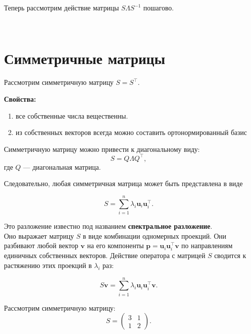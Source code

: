 \documentclass[11pt,a4paper]{article}
\providecommand{\tightlist}{%
      \setlength{\itemsep}{0pt}\setlength{\parskip}{0pt}}
\begin{document}
    Теперь рассмотрим действие матрицы \(S \Lambda S^{-1}\) пошагово.

    \begin{center}
    \end{center}
    { \hspace*{\fill} \\}
    
    \hypertarget{ux441ux438ux43cux43cux435ux442ux440ux438ux447ux43dux44bux435-ux43cux430ux442ux440ux438ux446ux44b}{%
\section{Симметричные
матрицы}\label{ux441ux438ux43cux43cux435ux442ux440ux438ux447ux43dux44bux435-ux43cux430ux442ux440ux438ux446ux44b}}

Рассмотрим симметричную матрицу \(S = S^\top\).

\textbf{Свойства:}

\begin{enumerate}
\def\labelenumi{\arabic{enumi}.}
\tightlist
\item
  все собственные числа вещественны.
\item
  из собственных векторов всегда можно составить ортонормированный базис
\end{enumerate}

Симметричную матрицу можно привести к диагональному виду:
\[ S = Q \Lambda Q^\top, \] где \(Q\) --- диагональная матрица.

Следовательно, любая симметричная матрица может быть представлена в виде

\[ S = \sum\limits_{i=1}^n \lambda_i \mathbf{u}_i \mathbf{u}_i^\top. \]

Это разложение известно под названием \textbf{спектральное
разложение}.\\
Оно выражает матрицу \(S\) в виде комбинации одномерных проекций. Они
разбивают любой вектор \(\mathbf{v}\) на его компоненты
\(\mathbf{p} = \mathbf{u}_i \mathbf{u}_i^\top \mathbf{v}\) по
направлениям единичных собственных векторов. Действие оператора с
матрицей \(S\) сводится к растяжению этих проекций в \(\lambda_i\) раз:

\[ S\mathbf{v} = \sum\limits_{i=1}^n \lambda_i \mathbf{u}_i \mathbf{u}_i^\top \mathbf{v}. \]

    Рассмотрим симметричную матрицу: \[
  S = 
  \begin{pmatrix}
    3 & 1 \\
    1 & 2
  \end{pmatrix}.
\]
\end{document}
